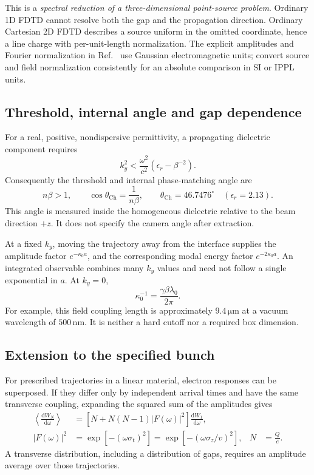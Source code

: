 \documentclass[11pt,a4paper]{article}
\newcommand{\dd}{\mathrm d}
\newcommand{\unit}[1]{\,\mathrm{#1}}
\numberwithin{equation}{section}
\begin{document}
This is a \emph{spectral reduction of a three-dimensional point-source
problem}. Ordinary 1D FDTD cannot resolve both the gap and the propagation
direction. Ordinary Cartesian 2D FDTD describes a source uniform in the
omitted coordinate, hence a line charge with per-unit-length normalization.
The explicit amplitudes and Fourier normalization in
Ref.~\cite{tyukhtin2021invertedprism} use Gaussian electromagnetic units;
convert source and field normalization consistently for an absolute
comparison in SI or IPPL units.

\subsection{Threshold, internal angle and gap dependence}

For a real, positive, nondispersive permittivity, a propagating dielectric
component requires
\begin{equation}
 k_y^2<\frac{\omega^2}{c^2}
       \left(\epsilon_r-\beta^{-2}\right).
\end{equation}
Consequently the threshold and internal phase-matching angle are
\begin{equation}
 n\beta>1,\qquad
 \cos\theta_{\mathrm{Ch}}=\frac{1}{n\beta},\qquad
 \theta_{\mathrm{Ch}}=46.7476^\circ
 \quad(\epsilon_r=2.13).
 \label{eq:angle}
\end{equation}
This angle is measured inside the homogeneous dielectric relative to
the beam direction \(+z\). It does not specify the camera angle after extraction.

At a fixed \(k_y\), moving the trajectory away from the interface supplies
the amplitude factor \(e^{-\kappa_0a}\), and the corresponding modal energy
factor \(e^{-2\kappa_0a}\). An integrated observable combines many \(k_y\)
values and need not follow a single exponential in \(a\). At \(k_y=0\),
\begin{equation}
 \kappa_0^{-1}=\frac{\gamma\beta\lambda_0}{2\pi}.
 \label{eq:coupling}
\end{equation}
For example, this field coupling length is approximately
\(9.4\unit{\mu m}\) at a vacuum wavelength of \(500\unit{nm}\).
It is neither a hard cutoff nor a required box dimension.

\subsection{Extension to the specified bunch}

For prescribed trajectories in a linear material, electron responses can
be superposed. If they differ only by independent arrival times and have
the same transverse coupling, expanding the squared sum of the amplitudes gives
\begin{align}
 \left\langle\frac{\dd W_N}{\dd\omega}\right\rangle
   &=\left[N+N(N-1)|F(\omega)|^2\right]
      \frac{\dd W_1}{\dd\omega}, \label{eq:bunch}\\
 |F(\omega)|^2&=\exp[-(\omega\sigma_t)^2]
              =\exp[-(\omega\sigma_z/v)^2],&
 N&=\frac{Q}{e}. \label{eq:formfactor}
\end{align}
A transverse distribution, including a distribution of gaps, requires
an amplitude average over those trajectories.
\end{document}
